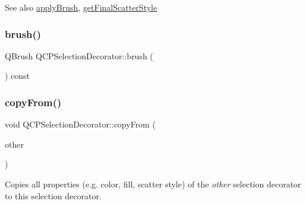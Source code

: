 \begin{DoxySeeAlso}{See also}
\hyperlink{class_q_c_p_selection_decorator_a225544527d51b49546b70d0e6d655a34}{apply\+Brush}, \hyperlink{class_q_c_p_selection_decorator_a1277b373248896bc70e8cc1de96da9fa}{get\+Final\+Scatter\+Style} 
\end{DoxySeeAlso}
\mbox{\label{class_q_c_p_selection_decorator_a783b643aa52120a25308fc501b9998b1}} 
\subsubsection{\texorpdfstring{brush()}{brush()}}
{\footnotesize\ttfamily Q\+Brush Q\+C\+P\+Selection\+Decorator\+::brush (\begin{DoxyParamCaption}{ }\end{DoxyParamCaption}) const\hspace{0.3cm}{\ttfamily [inline]}}

\mbox{\label{class_q_c_p_selection_decorator_a467a8d5cfcab27e862a17c797ac27b8a}} 
\subsubsection{\texorpdfstring{copy\+From()}{copyFrom()}}
{\footnotesize\ttfamily void Q\+C\+P\+Selection\+Decorator\+::copy\+From (\begin{DoxyParamCaption}\item[{const \hyperlink{class_q_c_p_selection_decorator}{Q\+C\+P\+Selection\+Decorator} $\ast$}]{other }\end{DoxyParamCaption})\hspace{0.3cm}{\ttfamily [virtual]}}

Copies all properties (e.\+g. color, fill, scatter style) of the {\itshape other} selection decorator to this selection decorator. \mbox{\label{class_q_c_p_selection_decorator_a4f8eb49e277063845391e803ae23054a}} 

